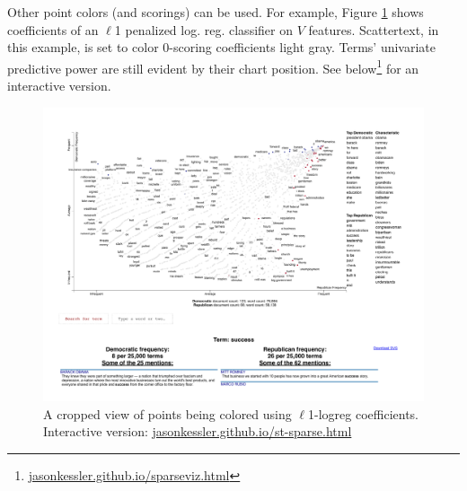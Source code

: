 \documentclass[11pt,a4paper]{article}
\begin{document}
Other point colors (and scorings) can be used.  For example, Figure \ref{scattertextsparse} shows coefficients of an $\ell$1 penalized log. reg. classifier on $V$ features.  Scattertext, in this example, is set to color 0-scoring coefficients light gray.  Terms' univariate predictive power are still evident by their chart position.  See below\footnote{
\href{https://jasonkessler.github.io/sparseviz.html}{jasonkessler.github.io/sparseviz.html}} for an interactive version.
\begin{figure}[h]
  \includegraphics[width=\linewidth]{sparse_crop}
  \caption{A cropped view of points being colored using $\ell$1-logreg coefficients. Interactive version: \href{https://jasonkessler.github.io/st-sparse.html}{jasonkessler.github.io/st-sparse.html}}
  \label{scattertextsparse}
\end{figure}
\end{document}
